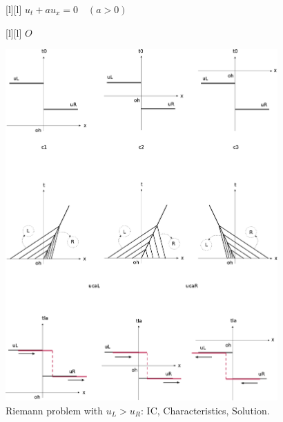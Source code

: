 \begin{figure}[ht]
	[l] {$\displaystyle u_{t} + au_{x} = 0 \quad (a>0)$}





	[l] {$O$}

	\includegraphics[width=0.93\textwidth]{RiemannAllCasesLR.eps}
	\caption{Riemann problem with $u_{L} >u_{R}$:  IC, Characteristics, Solution.}
	\label{\LABEL}
\end{figure}